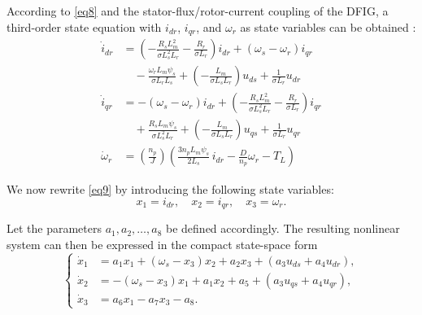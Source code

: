 \documentclass[conference]{IEEEtran}
\begin{document}
According to \eqref{eq8} and the stator-flux/rotor-current coupling of the DFIG, a third-order state equation with $i_{dr}$, $i_{qr}$, and $\omega_{r}$ as state variables can be obtained \cite{b24}:
\begin{equation}
\begin{aligned}
\dot{i}_{dr} &= \left( - \frac{R_{s}L_{m}^{2}}{\sigma L_{s}^{2}L_{r}} - \frac{R_{r}}{\sigma L_{r}} \right)i_{dr} + \left( \omega_{s} - \omega_{r} \right)i_{qr} \\
&\quad- \frac{\omega_{r}L_{m}\psi_{s}}{\sigma L_{r}L_{s}} + \left( - \frac{L_{m}}{\sigma L_{s}L_{r}} \right)u_{ds} + \frac{1}{\sigma L_{r}}u_{dr} \\[4pt]
\dot{i}_{qr} &= - \left( \omega_{s} - \omega_{r} \right)i_{dr} + \left( - \frac{R_{s}L_{m}^{2}}{\sigma L_{s}^{2}L_{r}} - \frac{R_{r}}{\sigma L_{r}} \right)i_{qr} \\
&\quad+ \frac{R_{s}L_{m}\psi_{s}}{\sigma L_{s}^{2}L_{r}} + \left( - \frac{L_{m}}{\sigma L_{s}L_{r}} \right)u_{qs} + \frac{1}{\sigma L_{r}}u_{qr} \\[4pt]
\dot{\omega}_{r} &= \left( \frac{n_{p}}{J} \right)\left( \frac{3n_{p}L_{m}\psi_{s}}{2L_{s}}\, i_{dr} - \frac{D}{n_{p}}\omega_{r} - T_{L} \right)
\end{aligned}
\label{eq9}
\end{equation}

We now rewrite \eqref{eq9} by introducing the following state variables:
\begin{equation*}
x_{1} = i_{dr},\quad x_{2} = i_{qr},\quad x_{3} = \omega_{r}.
\end{equation*}

Let the parameters $a_{1},a_{2},\ldots,a_{8}$ be defined accordingly. The resulting nonlinear system can then be expressed in the compact state-space form
\begin{equation}
\left\{ \begin{aligned}
\dot{x}_{1} &= a_{1}x_{1} + \left( \omega_{s} - x_{3} \right)x_{2} + a_{2}x_{3} + \left( a_{3}u_{ds} + a_{4}u_{dr} \right), \\
\dot{x}_{2} &= - \left( \omega_{s} - x_{3} \right)x_{1} + a_{1}x_{2} + a_{5} + \left( a_{3}u_{qs} + a_{4}u_{qr} \right), \\
\dot{x}_{3} &= a_{6}x_{1} - a_{7}x_{3} - a_{8}.
\end{aligned} \right.
\label{eq10}
\end{equation}
\end{document}
